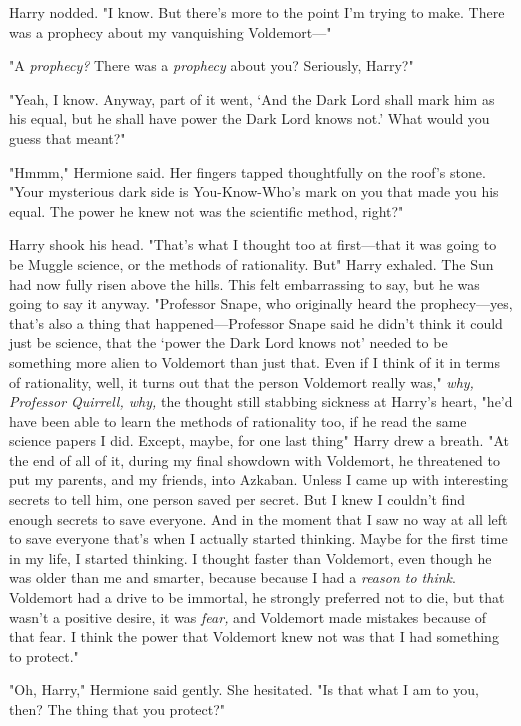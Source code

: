 Harry nodded. "I know. But there's more to the point I'm trying to make. There
was a prophecy about my vanquishing Voldemort—"

"A \emph{prophecy?} There was a \emph{prophecy} about you? Seriously, Harry?"

"Yeah, I know. Anyway, part of it went, `And the Dark Lord shall mark him as
his equal, but he shall have power the Dark Lord knows not.' What would you
guess that meant?"

"Hmmm," Hermione said. Her fingers tapped thoughtfully on the roof's stone.
"Your mysterious dark side is You-Know-Who's mark on you that made you his
equal. The power he knew not{\el} was the scientific method, right?"

Harry shook his head. "That's what I thought too at first—that it was going
to be Muggle science, or the methods of rationality. But{\el}" Harry
exhaled. The Sun had now fully risen above the hills. This felt embarrassing to
say, but he was going to say it anyway. "Professor Snape, who originally heard
the prophecy—yes, that's also a thing that happened—Professor Snape said he
didn't think it could just be science, that the `power the Dark Lord knows not'
needed to be something more alien to Voldemort than just that. Even if I think
of it in terms of rationality, well, it turns out that the person Voldemort
really was," \emph{why, Professor Quirrell, why,} the thought still stabbing
sickness at Harry's heart, "he'd have been able to learn the methods of
rationality too, if he read the same science papers I did. Except, maybe, for
one last thing{\el}" Harry drew a breath. "At the end of all of it, during
my final showdown with Voldemort, he threatened to put my parents, and my
friends, into Azkaban. Unless I came up with interesting secrets to tell him,
one person saved per secret. But I knew I couldn't find enough secrets to save
everyone. And in the moment that I saw no way at all left to save
everyone{\el} that's when I actually started thinking. Maybe for the first
time in my life, I started thinking. I thought faster than Voldemort, even
though he was older than me and smarter, because{\el} because I had a
\emph{reason to think}. Voldemort had a drive to be immortal, he strongly
preferred not to die, but that wasn't a positive desire, it was \emph{fear,}
and Voldemort made mistakes because of that fear. I think the power that
Voldemort knew not{\el} was that I had something to protect."

"Oh, Harry," Hermione said gently. She hesitated. "Is that what I am to you,
then? The thing that you protect?"

